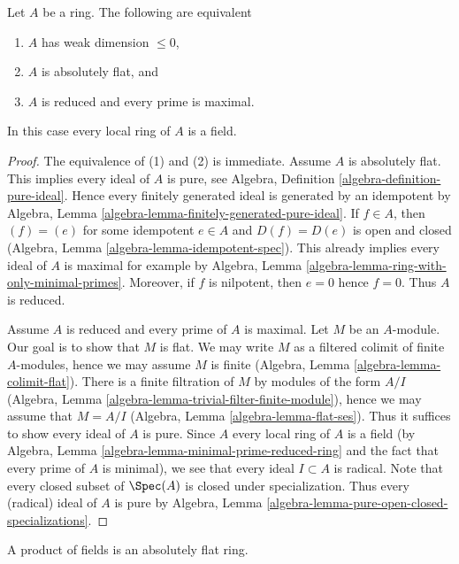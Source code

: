 \begin{lemma}
\label{lemma-absolutely-flat}
Let $A$ be a ring. The following are equivalent
\begin{enumerate}
\item $A$ has weak dimension $\leq 0$,
\item $A$ is absolutely flat, and
\item $A$ is reduced and every prime is maximal.
\end{enumerate}
In this case every local ring of $A$ is a field.
\end{lemma}

\begin{proof}
The equivalence of (1) and (2) is immediate.
Assume $A$ is absolutely flat. This implies every ideal of $A$ is pure, see
Algebra, Definition \ref{algebra-definition-pure-ideal}.
Hence every finitely generated ideal is generated by an idempotent by
Algebra, Lemma \ref{algebra-lemma-finitely-generated-pure-ideal}.
If $f \in A$, then $(f) = (e)$ for some idempotent $e \in A$
and $D(f) = D(e)$ is open and closed
(Algebra, Lemma \ref{algebra-lemma-idempotent-spec}).
This already implies every ideal of $A$ is maximal
for example by
Algebra, Lemma \ref{algebra-lemma-ring-with-only-minimal-primes}.
Moreover, if $f$ is nilpotent, then $e = 0$ hence $f = 0$.
Thus $A$ is reduced.

\medskip\noindent
Assume $A$ is reduced and every prime of $A$ is maximal.
Let $M$ be an $A$-module. Our goal is to show that $M$ is flat.
We may write $M$ as a filtered colimit of finite $A$-modules, hence
we may assume $M$ is finite
(Algebra, Lemma \ref{algebra-lemma-colimit-flat}).
There is a finite filtration of $M$ by modules of the form
$A/I$ (Algebra, Lemma \ref{algebra-lemma-trivial-filter-finite-module}),
hence we may assume that $M = A/I$
(Algebra, Lemma \ref{algebra-lemma-flat-ses}).
Thus it suffices to show every ideal of $A$ is pure.
Since $A$ every local ring of $A$ is a field
(by Algebra, Lemma \ref{algebra-lemma-minimal-prime-reduced-ring} and
the fact that every prime of $A$ is minimal),
we see that every ideal $I \subset A$ is radical.
Note that every closed subset of $\Spec(A)$ is closed under specialization.
Thus every (radical) ideal of $A$ is pure by
Algebra, Lemma \ref{algebra-lemma-pure-open-closed-specializations}.
\end{proof}

\begin{lemma}
\label{lemma-product-fields-absolutely-flat}
A product of fields is an absolutely flat ring.
\end{lemma}

